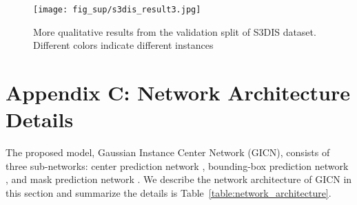 \documentclass[runningheads]{llncs}
\begin{document}
\begin{figure}[H]
\centering
\begin{center}
 \texttt{[image: fig\_sup/s3dis\_result3.jpg]}
   \caption{More qualitative results from the validation split of S3DIS dataset. Different colors indicate different instances }
\label{fig:s3dis_more_results}
\end{center}
\end{figure}




\section*{Appendix C: Network Architecture Details}
The proposed model, Gaussian Instance Center Network (GICN), consists of three sub-networks: center prediction network , bounding-box prediction network , and mask prediction network . We describe the network architecture of GICN in this section and summarize the details is Table~\ref{table:network_architecture}. 
\end{document}
